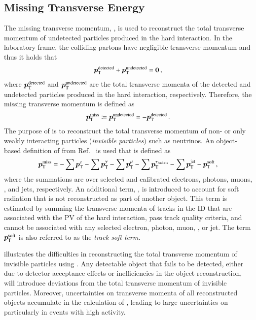 \subsection{Missing Transverse Energy}%
\label{sec:atlas_met}

The missing transverse momentum, \pTmiss, is used to reconstruct the total
transverse momentum of undetected particles produced in the hard interaction. In
the laboratory frame, the colliding partons have negligible transverse momentum
and thus it holds that
\begin{align*}
  \bm{p}_{\text{T}}^{\text{detected}} + \bm{p}_{\text{T}}^{\text{undetected}} = \bm{0} \,\text{,}
\end{align*}
where $\bm{p}_{\text{T}}^{\text{detected}}$ and
$\bm{p}_{\text{T}}^{\text{undetected}}$ are the total transverse momenta of
the detected and undetected particles produced in the hard interaction,
respectively. Therefore, the missing transverse momentum is defined as
\begin{align*}
  \bm{p}_{\text{T}}^{\text{miss}}
  \coloneqq \bm{p}_{\text{T}}^{\text{undetected}}
  = -\bm{p}_{\text{T}}^{\text{detected}} \,\text{.}
\end{align*}
The purpose of \pTmiss is to reconstruct the total transverse momentum of non-
or only weakly interacting particles (\emph{invisible particles}) such as
neutrinos. An object-based definition of \pTmiss from Ref.~\cite{PERF-2016-07}
is used that is defined as
\begin{align}
  \bm{p}_{\text{T}}^{\text{miss}} =
  - \sum \bm{p}_{\text{T}}^{e}
  - \sum \bm{p}_{\text{T}}^{\gamma}
  - \sum \bm{p}_{\text{T}}^{\mu}
  - \sum \bm{p}_{\text{T}}^{\tau_{\text{had-vis}}}
  - \sum \bm{p}_{\text{T}}^{\text{jet}}
  - \bm{p}_{\text{T}}^{\text{soft}}
  \,\text{,}
  \label{eq:met}
\end{align}
where the summations are over selected and calibrated electrons, photons, muons,
\tauhadvis, and jets, respectively. An additional term, , is
introduced to account for soft radiation that is not reconstructed as part of
another object. This term is estimated by summing the transverse momenta of
tracks in the ID that are associated with the PV of the hard interaction, pass
track quality criteria, and cannot be associated with any selected electron,
photon, muon, \tauhadvis, or jet. The term $\bm{p}_{\text{T}}^{\text{soft}}$ is also
referred to as the \emph{track soft term}.

 illustrates the difficulties in reconstructing the total
transverse momentum of invisible particles using \pTmiss. Any detectable object
that fails to be detected, either due to detector acceptance effects or
inefficiencies in the object reconstruction, will introduce deviations from the
total transverse momentum of invisible particles. Moreover, uncertainties on
transverse momenta of all reconstructed objects accumulate in the calculation of
\pTmiss, leading to large uncertainties on \pTmiss particularly in events with
high activity.

